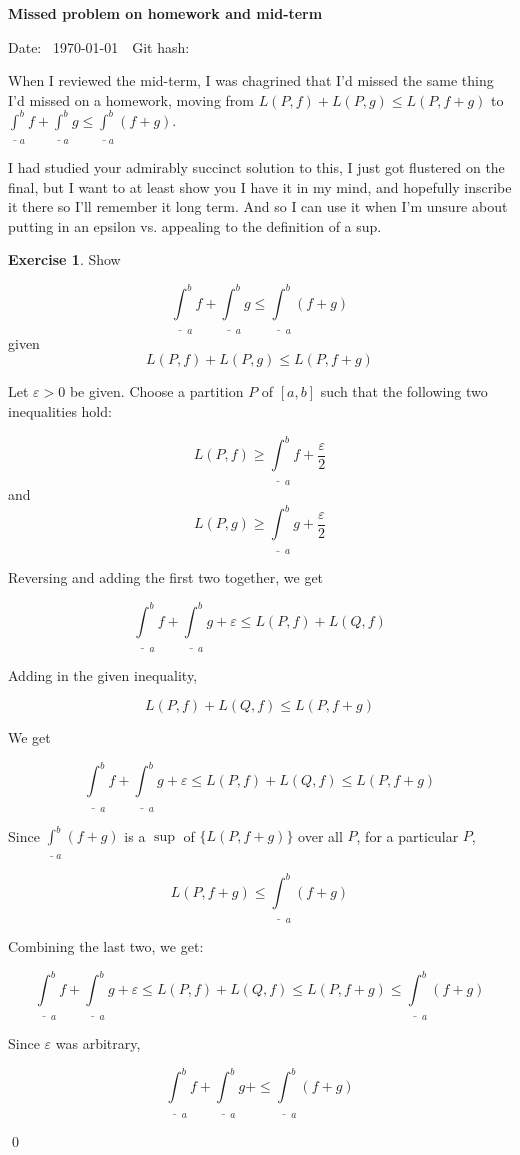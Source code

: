 \documentclass[11pt,oneside]{article}
\numberwithin{equation}{section}
\theoremstyle{definition}
\newtheorem{exercise}{Exercise}
\begin{document}
\textbf{Missed problem on homework and mid-term}

Date: \hhmmsstime{} \ \today \ \ Git hash: 


When I reviewed the mid-term, I was chagrined that I'd missed the same
thing I'd missed on a homework, moving from  $L(P, f) + L(P, g) \leq L(P, f+g)$ to
$ \underline \int _ a ^ b f + \underline \int _a ^b g \leq \underline \int _ a ^ b (f + g) $.

I had studied your admirably succinct solution to this, I just got
flustered on the final, but I want to at least show you I have it in
my mind, and hopefully inscribe it there so I'll remember it long
term. And so I can use it when I'm unsure about putting in an epsilon
vs. appealing to the definition of a sup.

\begin{exercise}
  Show
  
  \[ \underline \int _ a ^ b f + \underline \int _a ^b g \leq \underline \int _ a ^ b (f + g)
  \]
  given
  \[
  L(P, f) + L(P, g) \leq L(P, f+g)
  \]
\end{exercise}

\begin{solution}
  Let $\varepsilon > 0$ be given. Choose a partition $P$ of $[a,b]$ such that the following two inequalities hold:

  \[
  L(P, f) \geq \underline \int _ {a} ^ {b} f + \frac{\varepsilon }{2}
  \]
  and
  \[
  L(P, g) \geq \underline \int _ {a} ^ {b} g + \frac{\varepsilon }{2}
  \]

  Reversing and adding the first two together, we get

  \[
   \underline \int _ {a} ^ {b} f +  \underline \int _ {a} ^ {b} g + \varepsilon \leq L(P, f) + L(Q, f)
  \]

  Adding in the given inequality,

  \[
    L(P, f) + L(Q, f) \leq L(P, f+g)
  \]

  We get

  \[ 
     \underline \int _ {a} ^ {b} f +  \underline \int _ {a} ^ {b} g + \varepsilon \leq L(P, f) + L(Q, f) \leq L(P, f+g)
  \]

  Since $\underline \int _ {a} ^ {b} ( f + g)$ is a $\sup {} $ of $ \{ L(P, f+g) \} $ over all $P$, for a particular $P$,
    
    \[
    L(P, f+g) \leq \underline \int _ {a} ^ {b} ( f + g)
    \]
    
    Combining the last two, we get:

    \[
    \underline \int _ {a} ^ {b} f +  \underline \int _ {a} ^ {b} g + \varepsilon \leq L(P, f) + L(Q, f) \leq L(P, f+g) \leq  \underline \int _ {a} ^ {b} ( f + g)
    \]

    Since $\varepsilon$ was arbitrary,

    \[
    \underline \int _ {a} ^ {b} f +  \underline \int _ {a} ^ {b} g + \leq  \underline \int _ {a} ^ {b} ( f + g)
    \]
    
    \qed
  
\end{solution}
\end{document}
